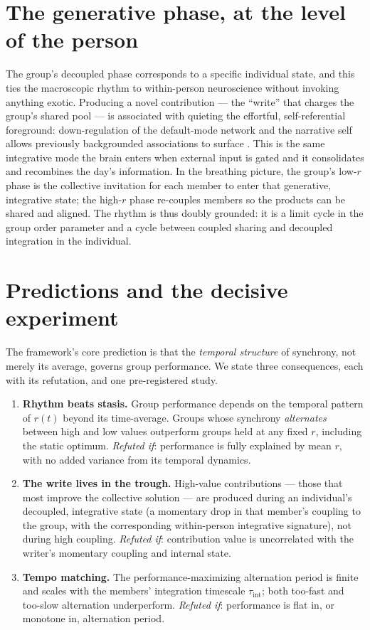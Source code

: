 \documentclass[11pt]{article}
\begin{document}
\section{The generative phase, at the level of the person}

The group's decoupled phase corresponds to a specific individual state, and this ties the macroscopic rhythm to within-person neuroscience without invoking anything exotic. Producing a novel contribution --- the ``write'' that charges the group's shared pool --- is associated with quieting the effortful, self-referential foreground: down-regulation of the default-mode network and the narrative self allows previously backgrounded associations to surface \citep{brewer2011meditation}. This is the same integrative mode the brain enters when external input is gated and it consolidates and recombines the day's information. In the breathing picture, the group's low-$r$ phase is the collective invitation for each member to enter that generative, integrative state; the high-$r$ phase re-couples members so the products can be shared and aligned. The rhythm is thus doubly grounded: it is a limit cycle in the group order parameter and a cycle between coupled sharing and decoupled integration in the individual.

\section{Predictions and the decisive experiment}
\label{sec:exp}

The framework's core prediction is that the \emph{temporal structure} of synchrony, not merely its average, governs group performance. We state three consequences, each with its refutation, and one pre-registered study.

\begin{enumerate}
  \item \textbf{Rhythm beats stasis.} Group performance depends on the temporal pattern of $r(t)$ beyond its time-average. Groups whose synchrony \emph{alternates} between high and low values outperform groups held at any fixed $r$, including the static optimum. \emph{Refuted if}: performance is fully explained by mean $r$, with no added variance from its temporal dynamics.
  \item \textbf{The write lives in the trough.} High-value contributions --- those that most improve the collective solution --- are produced during an individual's decoupled, integrative state (a momentary drop in that member's coupling to the group, with the corresponding within-person integrative signature), not during high coupling. \emph{Refuted if}: contribution value is uncorrelated with the writer's momentary coupling and internal state.
  \item \textbf{Tempo matching.} The performance-maximizing alternation period is finite and scales with the members' integration timescale $\tau_{\text{int}}$; both too-fast and too-slow alternation underperform. \emph{Refuted if}: performance is flat in, or monotone in, alternation period.
\end{enumerate}
\end{document}
